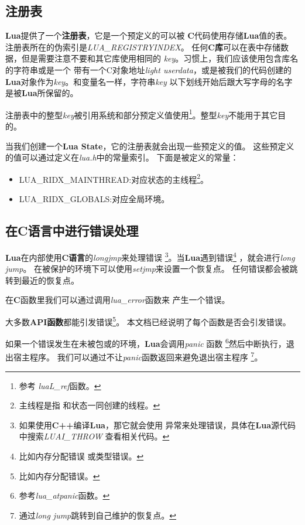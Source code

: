 \documentclass{ctexart}
\begin{document}
\subsection{注册表}

\textbf{Lua}提供了一个\textbf{注册表}，它是一个预定义的可以被
\textbf{C}代码使用存储\textbf{Lua}值的表。
注册表所在的伪索引是\emph{LUA\_REGISTRYINDEX}。
任何\textbf{C库}可以在表中存储数据，但是需要注意不要和其它库使用相同的
\emph{key}。习惯上，我们应该使用包含库名的字符串或是一个
带有一个C对象地址\emph{light userdata}，或是被我们的代码创建的
\textbf{Lua}对象作为\emph{key}。和变量名一样，字符串\emph{key}
以下划线开始后跟大写字母的名字是被\textbf{Lua}所保留的。

注册表中的整型\emph{key}被引用系统和部分预定义值使用\footnote{参考
\emph{luaL\_ref}函数。}。整型\emph{key}不能用于其它目的。

当我们创建一个\textbf{Lua State}，它的注册表就会出现一些预定义的值。
这些预定义的值可以通过定义在\emph{lua.h}中的常量索引。
下面是被定义的常量：

\begin{itemize}
\item LUA\_RIDX\_MAINTHREAD:对应状态的主线程\footnote{主线程是指
和状态一同创建的线程。}。
\item LUA\_RIDX\_GLOBALS:对应全局环境。
\end{itemize}

\subsection{在C语言中进行错误处理}

\textbf{Lua}在内部使用\textbf{C语言}的\emph{longjmp}来处理错误
\footnote{如果使用\textbf{C++}编译\textbf{Lua}，那它就会使用
异常来处理错误，具体在\textbf{Lua}源代码中搜索\emph{LUAI\_THROW}
查看相关代码。}。当\textbf{Lua}遇到错误\footnote{比如内存分配错误
或类型错误。}
，就会进行\emph{long jump}。
在被保护的环境下可以使用\emph{setjmp}来设置一个恢复点。
任何错误都会被跳转到最近的恢复点。

在\textbf{C}函数里我们可以通过调用\emph{lua\_error}函数来
产生一个错误。

大多数\textbf{API函数}都能引发错误\footnote{比如内存分配错误。}。
本文档已经说明了每个函数是否会引发错误。

如果一个错误发生在未被包或的环境，\textbf{Lua}会调用\emph{panic}
函数
\footnote{参考\emph{lua\_atpanic}函数。}然后中断执行，退出宿主程序。
我们可以通过不让\emph{panic}函数返回来避免退出宿主程序
\footnote{通过\emph{long jump}跳转到自己维护的恢复点。}。
\end{document}
